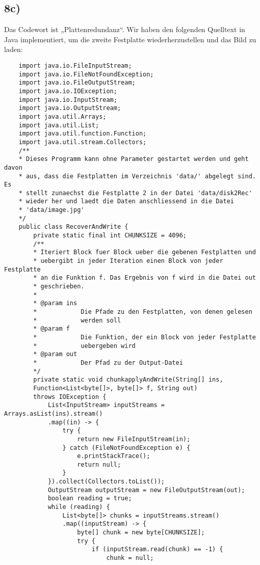 \documentclass[ngerman]{fbi-aufgabenblatt}
\begin{document}
	\subsection*{8c)}
	Das Codewort ist „Plattenredundanz“. Wir haben den folgenden Quelltext in Java implementiert, um die zweite Festplatte wiederherzustellen und das Bild zu laden:
	\begin{lstlisting}
	import java.io.FileInputStream;
	import java.io.FileNotFoundException;
	import java.io.FileOutputStream;
	import java.io.IOException;
	import java.io.InputStream;
	import java.io.OutputStream;
	import java.util.Arrays;
	import java.util.List;
	import java.util.function.Function;
	import java.util.stream.Collectors;
	/**
	* Dieses Programm kann ohne Parameter gestartet werden und geht davon
	* aus, dass die Festplatten im Verzeichnis 'data/' abgelegt sind. Es
	* stellt zunaechst die Festplatte 2 in der Datei 'data/disk2Rec'
	* wieder her und laedt die Daten anschliessend in die Datei
	* 'data/image.jpg'
	*/
	public class RecoverAndWrite {
		private static final int CHUNKSIZE = 4096;
		/**
		* Iteriert Block fuer Block ueber die gebenen Festplatten und
		* uebergibt in jeder Iteration einen Block von jeder Festplatte
		* an die Funktion f. Das Ergebnis von f wird in die Datei out
		* geschrieben.
		* 
		* @param ins
		*            Die Pfade zu den Festplatten, von denen gelesen
		*            werden soll
		* @param f
		*            Die Funktion, der ein Block von jeder Festplatte
		*            uebergeben wird
		* @param out
		*            Der Pfad zu der Output-Datei
		*/
		private static void chunkapplyAndWrite(String[] ins,
		Function<List<byte[]>, byte[]> f, String out)
		throws IOException {
			List<InputStream> inputStreams = Arrays.asList(ins).stream()
			.map((in) -> {
				try {
					return new FileInputStream(in);
				} catch (FileNotFoundException e) {
					e.printStackTrace();
					return null;
				}
			}).collect(Collectors.toList());
			OutputStream outputStream = new FileOutputStream(out);
			boolean reading = true;
			while (reading) {
				List<byte[]> chunks = inputStreams.stream()
				.map((inputStream) -> {
					byte[] chunk = new byte[CHUNKSIZE];
					try {
						if (inputStream.read(chunk) == -1) {
							chunk = null;

\end{lstlisting}
\end{document}
